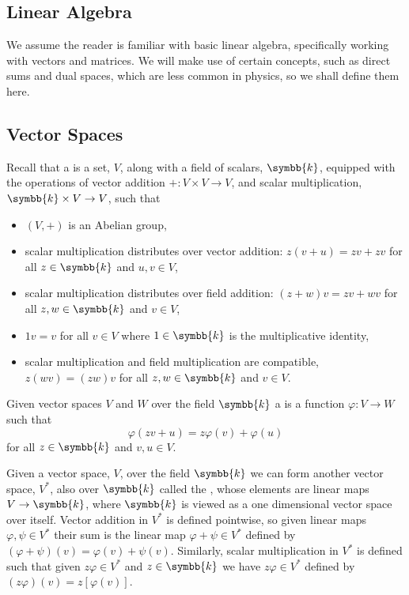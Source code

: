 \documentclass[fleqn]{NotesClass}
\renewcommand{\field}{\symbb{k}}
\newcommand{\dual}[1]{{#1^{*}}}
\begin{document}
    
    \printbibliography
    \appendixpage
    \begin{appendices}
        \chapter{Linear Algebra}\label{sec:linear algebra}
        We assume the reader is familiar with basic linear algebra, specifically working with vectors and matrices.
        We will make use of certain concepts, such as direct sums and dual spaces, which are less common in physics, so we shall define them here.
        
        \section{Vector Spaces}
        Recall that a  is a set, \(V\), along with a field of scalars, \(\field\), equipped with the operations of vector addition \(+ \colon V \times V \to V\), and scalar multiplication, \(\field \times V \to V\), such that
        \begin{itemize}
            \item \((V, +)\) is an Abelian group,
            \item scalar multiplication distributes over vector addition: \(z(v + u) = zv + zv\) for all \(z \in \field\) and \(u, v \in V\),
            \item scalar multiplication distributes over field addition: \((z + w)v = zv + wv\) for all \(z, w \in \field\) and \(v \in V\),
            \item \(1v = v\) for all \(v \in V\) where \(1 \in \field\) is the multiplicative identity,
            \item scalar multiplication and field multiplication are compatible, \(z(wv) = (zw)v\) for all \(z, w \in \field\) and \(v \in V\).
        \end{itemize}
        
        Given vector spaces \(V\) and \(W\) over the field \(\field\) a  is a function \(\varphi \colon V \to W\) such that
        \begin{equation}
            \varphi(zv + u) = z\varphi(v) + \varphi(u)
        \end{equation}
        for all \(z\in \field\) and \(v, u \in V\).
        
        Given a vector space, \(V\), over the field \(\field\) we can form another vector space, \(\dual{V}\), also over \(\field\) called the , whose elements are linear maps \(V \to \field\), where \(\field\) is viewed as a one dimensional vector space over itself.
        Vector addition in \(\dual{V}\) is defined pointwise, so given linear maps \(\varphi, \psi \in \dual{V}\) their sum is the linear map \(\varphi + \psi \in \dual{V}\) defined by \((\varphi + \psi)(v) = \varphi(v) + \psi(v)\).
        Similarly, scalar multiplication in \(\dual{V}\) is defined such that given \(z \varphi \in \dual{V}\) and \(z \in \field\) we have \(z\varphi \in \dual{V}\) defined by \((z\varphi)(v) = z[\varphi(v)]\).
        

\end{appendices}
\end{document}
